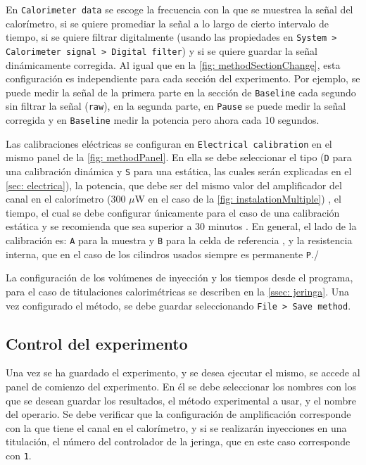 	En \texttt{Calorimeter data} se escoge la frecuencia con la que se muestrea la se\~nal del calor\'imetro, si se quiere promediar la se\~nal a lo largo de cierto intervalo de tiempo, si se quiere filtrar digitalmente (usando las propiedades en \texttt{System > Calorimeter signal > Digital filter}) y si se quiere guardar la se\~nal din\'amicamente corregida. Al igual que en la \autoref{fig: methodSectionChange}, esta configuraci\'on es independiente para cada secci\'on del experimento. Por ejemplo, se puede medir la se\~nal de la primera parte en la secci\'on de \texttt{Baseline} cada segundo sin filtrar la se\~nal (\texttt{raw}), en la segunda parte, en \texttt{Pause} se puede medir la se\~nal corregida y en \texttt{Baseline} medir la potencia pero ahora cada 10 segundos.
	
	Las calibraciones el\'ectricas se configuran en \texttt{Electrical calibration} en el mismo panel de la \autoref{fig: methodPanel}. En ella se debe seleccionar el tipo (\texttt{D} para una calibraci\'on din\'amica y \texttt{S} para una est\'atica, las cuales ser\'an explicadas en el \autoref{sec: electrica}), la potencia, que debe ser del mismo valor del amplificador del canal en el calor\'imetro (300 $\mu$W en el caso de la \autoref{fig: instalationMultiple}) \cite{Suurkuusk}, el tiempo, el cual se debe configurar \'unicamente para el caso de una calibraci\'on est\'atica y se recomienda que sea superior a 30 minutos \cite{Suurkuusk}. En general, el lado de la calibraci\'on es: \texttt{A} para la muestra y \texttt{B} para la celda de referencia \cite{Suurkuusk}, y la resistencia interna, que en el caso de los cilindros usados siempre es permanente \texttt{P}./
	
	La configuraci\'on de los vol\'umenes de inyecci\'on y los tiempos desde el programa, para el caso de titulaciones calorimétricas se describen en la \autoref{ssec: jeringa}. Una vez configurado el método, se debe guardar seleccionando \texttt{File > Save method}.
	
	\subsection{Control del experimento}
	Una vez se ha guardado el experimento, y se desea ejecutar el mismo, se accede al panel de comienzo del experimento. En \'el se debe seleccionar los nombres con los que se desean guardar los resultados, el m\'etodo experimental a usar, y el nombre del operario. Se debe verificar que la configuraci\'on de amplificaci\'on corresponde con la que tiene el canal en el calor\'imetro, y si se realizar\'an inyecciones en una titulaci\'on, el n\'umero del controlador de la jeringa, que en este caso corresponde con \texttt{1}.
	
